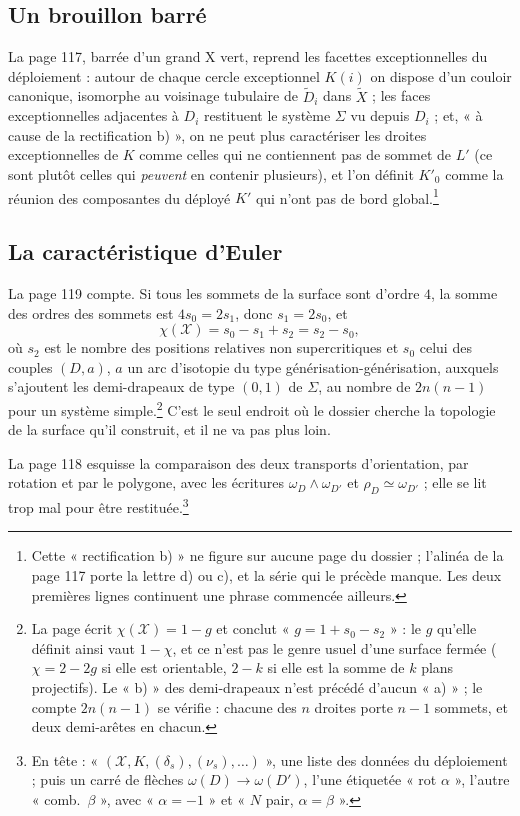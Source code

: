 \documentclass[11pt,a4paper]{article}
\begin{document}
\subsection*{Un brouillon barré}

La page 117, barrée d'un grand X vert, reprend les facettes exceptionnelles du
déploiement : autour de chaque cercle exceptionnel $K(i)$ on dispose d'un
couloir canonique, isomorphe au voisinage tubulaire de $\widetilde{D}_i$ dans
$\widetilde{X}$ ; les faces exceptionnelles adjacentes à $D_i$ restituent le
système $\Sigma$ vu depuis $D_i$ ; et, « à cause de la rectification b) », on ne
peut plus caractériser les droites exceptionnelles de $K$ comme celles qui ne
contiennent pas de sommet de $L'$ (ce sont plutôt celles qui \emph{peuvent} en
contenir plusieurs), et l'on définit $K'_0$ comme la réunion des composantes du
déployé $K'$ qui n'ont pas de bord global.\footnote{Cette « rectification b) » ne
figure sur aucune page du dossier ; l'alinéa de la page 117 porte la lettre d)
ou c), et la série qui le précède manque. Les deux premières lignes continuent
une phrase commencée ailleurs.}

\subsection*{La caractéristique d'Euler}

La page 119 compte. Si tous les sommets de la surface sont d'ordre $4$, la
somme des ordres des sommets est $4s_0 = 2s_1$, donc $s_1 = 2s_0$, et
\[
\chi(\mathcal{X}) = s_0 - s_1 + s_2 = s_2 - s_0 ,
\]
où $s_2$ est le nombre des positions relatives non supercritiques et $s_0$ celui
des couples $(D, a)$, $a$ un arc d'isotopie du type générisation-générisation,
auxquels s'ajoutent les demi-drapeaux de type $(0, 1)$ de $\Sigma$, au nombre de
$2n(n-1)$ pour un système simple.\footnote{La page écrit $\chi(\mathcal{X}) = 1
- g$ et conclut « $g = 1 + s_0 - s_2$ » : le $g$ qu'elle définit ainsi vaut $1 -
\chi$, et ce n'est pas le genre usuel d'une surface fermée ($\chi = 2 - 2g$ si
elle est orientable, $2 - k$ si elle est la somme de $k$ plans projectifs). Le
« b) » des demi-drapeaux n'est précédé d'aucun « a) » ; le compte $2n(n-1)$ se
vérifie : chacune des $n$ droites porte $n - 1$ sommets, et deux demi-arêtes en
chacun.} C'est le seul endroit où le dossier cherche la topologie de la surface
qu'il construit, et il ne va pas plus loin.

La page 118 esquisse la comparaison des deux transports d'orientation, par
rotation et par le polygone, avec les écritures $\omega_D \wedge \omega_{D'}$ et
$\rho_D \simeq \omega_{D'}$ ; elle se lit trop mal pour être
restituée.\footnote{En tête : « $(\mathcal{X}, K, (\delta_s), (\nu_s), \ldots)$ »,
une liste des données du déploiement ; puis un carré de flèches $\omega(D) \to
\omega(D')$, l'une étiquetée « rot $\alpha$ », l'autre « comb.\ $\beta$ », avec
« $\alpha = -1$ » et « $N$ pair, $\alpha = \beta$ ».}
\end{document}
